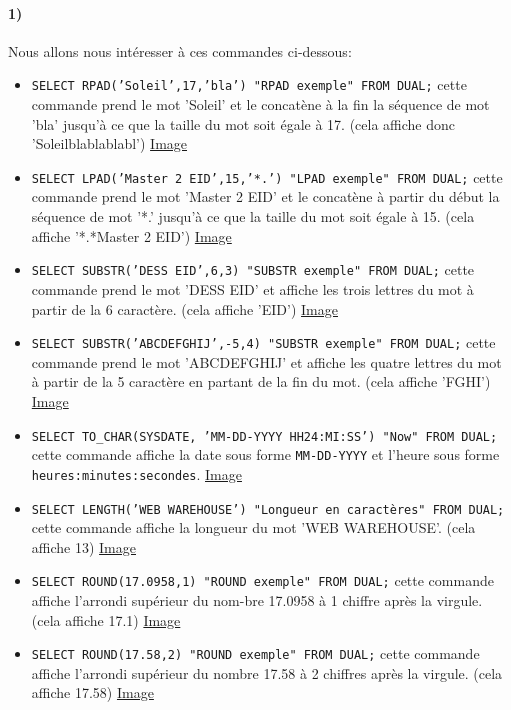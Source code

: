 \documentclass{report}
\begin{document}
\paragraph{1)}Nous allons nous intéresser à ces commandes ci-dessous:
\begin{itemize}
	\item {\tt SELECT RPAD('Soleil',17,'bla') "RPAD exemple" FROM DUAL;} cette commande prend le mot 'Soleil' et le concatène à la fin la séquence de mot 'bla' jusqu'à ce que la taille du mot soit égale à 17. (cela affiche donc 'Soleilblablablabl') \href{run:./Images/TP3/tp3_fonction1.png}{Image}
	\item {\tt SELECT LPAD('Master 2 EID',15,'*.') "LPAD exemple" FROM DUAL;} cette commande prend le mot 'Master 2 EID' et le concatène à partir du début la séquence de mot '*.' jusqu'à ce que la taille du mot soit égale à 15. (cela affiche '*.*Master 2 EID') \href{run:./Images/TP3/tp3_fonction2.png}{Image}
	\item {\tt SELECT SUBSTR('DESS EID',6,3) "SUBSTR exemple" FROM DUAL;} cette commande prend le mot 'DESS EID' et affiche les trois lettres du mot à partir de la 6 caractère. (cela affiche 'EID') \href{run:./Images/TP3/tp3_fonction3.png}{Image}
	\item {\tt SELECT SUBSTR('ABCDEFGHIJ',-5,4) "SUBSTR exemple" FROM DUAL;} cette commande prend le mot 'ABCDEFGHIJ' et affiche les quatre lettres du mot à partir de la 5 caractère en partant de la fin du mot. (cela affiche 'FGHI') \href{run:./Images/TP3/tp3_fonction4.png}{Image}
	\item {\tt SELECT TO\_CHAR(SYSDATE, 'MM-DD-YYYY HH24:MI:SS') "Now" FROM DUAL;} cette commande affiche la date sous forme {\tt MM-DD-YYYY} et l'heure sous forme {\tt heures:minutes:secondes}. \href{run:./Images/TP3/tp3_fonction5.png}{Image}
	\item {\tt SELECT LENGTH('WEB WAREHOUSE') "Longueur en caractères" FROM DUAL;} cette commande affiche la longueur du mot 'WEB WAREHOUSE'. (cela affiche 13) \href{run:./Images/TP3/tp3_fonction6.png}{Image}
	\item {\tt SELECT ROUND(17.0958,1) "ROUND exemple" FROM DUAL;} cette commande affiche l'arrondi supérieur du nom-bre 17.0958 à 1 chiffre après la virgule. (cela affiche 17.1) \href{run:./Images/TP3/tp3_fonction7.png}{Image}
	\item {\tt SELECT ROUND(17.58,2) "ROUND exemple" FROM DUAL;} cette commande affiche l'arrondi supérieur du nombre 17.58 à 2 chiffres après la virgule. (cela affiche 17.58) \href{run:./Images/TP3/tp3_fonction8.png}{Image}

\end{itemize}
\end{document}
